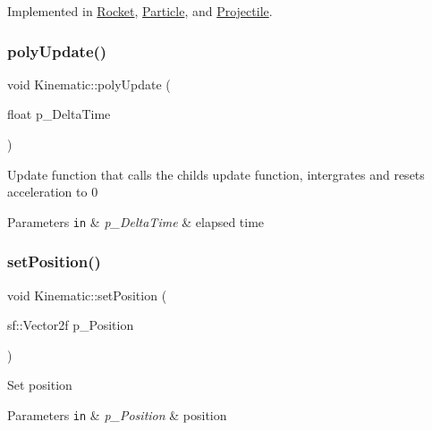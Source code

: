 Implemented in \hyperlink{class_rocket_a4b83a058408ee42ea77248dd8f0d3339}{Rocket}, \hyperlink{class_particle_a57316a997dbf6b060ec989c059ba9616}{Particle}, and \hyperlink{class_projectile_ac61792f1670310d35ecec906ab5ada9d}{Projectile}.

\mbox{\label{class_kinematic_aafc7bfadfcbbfe84d58162063f0ae94a}} 
\subsubsection{\texorpdfstring{poly\+Update()}{polyUpdate()}}
{\footnotesize\ttfamily void Kinematic\+::poly\+Update (\begin{DoxyParamCaption}\item[{float}]{p\+\_\+\+Delta\+Time }\end{DoxyParamCaption})}

Update function that calls the child\textquotesingle{}s update function, intergrates and resets acceleration to 0 
\begin{DoxyParams}[1]{Parameters}
\mbox{\tt in}  & {\em p\+\_\+\+Delta\+Time} & elapsed time \\
\hline
\end{DoxyParams}
\mbox{\label{class_kinematic_afcf0ed9a3b711fd149cb64cc66711c6c}} 
\subsubsection{\texorpdfstring{set\+Position()}{setPosition()}}
{\footnotesize\ttfamily void Kinematic\+::set\+Position (\begin{DoxyParamCaption}\item[{sf\+::\+Vector2f}]{p\+\_\+\+Position }\end{DoxyParamCaption})}

Set position 
\begin{DoxyParams}[1]{Parameters}
\mbox{\tt in}  & {\em p\+\_\+\+Position} & position \\
\hline
\end{DoxyParams}
\mbox{\label{class_kinematic_ad32a87fafb92696178ec3edf69b4657c}} 
